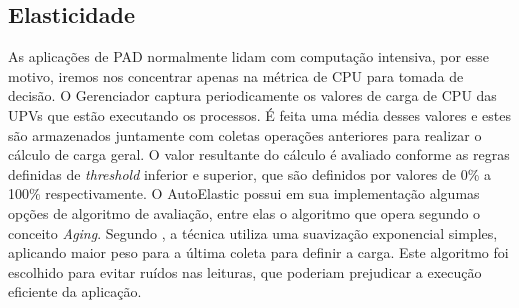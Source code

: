 \documentclass[twoside,english,brazilian]{UNISINOSartigo}
\begin{document}
\subsection{Elasticidade}
As aplicações de PAD normalmente lidam com computação intensiva, por esse motivo, iremos nos concentrar apenas na métrica de CPU para tomada de decisão. O Gerenciador captura periodicamente os valores de carga de CPU das UPVs que estão executando os processos. É feita uma média desses valores e estes são armazenados juntamente com coletas operações anteriores para realizar o cálculo de carga geral. O valor resultante do cálculo é avaliado conforme as regras definidas de \textit{threshold} inferior e superior, que são definidos por valores de 0\% a 100\% respectivamente. O AutoElastic possui em sua implementação algumas opções de algoritmo de avaliação, entre elas o algoritmo que opera segundo o conceito \textit{Aging}. Segundo , a técnica utiliza uma suavização exponencial simples, aplicando maior peso para a última coleta para definir a carga. Este algoritmo foi escolhido para evitar ruídos nas leituras, que poderiam prejudicar a execução eficiente da aplicação.
\end{document}
